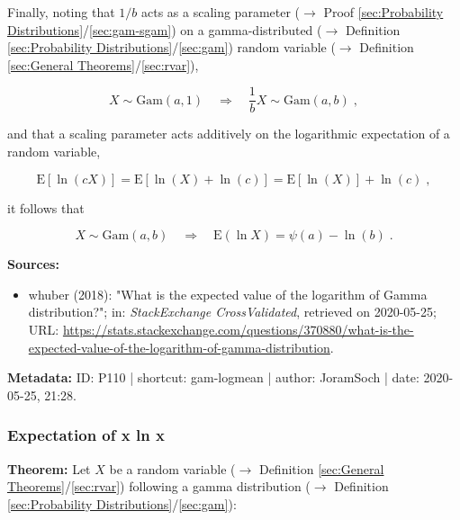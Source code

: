 \documentclass[a4paper,12pt,twoside]{book}
\begin{document}
Finally, noting that $1/b$ acts as a scaling parameter ($\rightarrow$ Proof \ref{sec:Probability Distributions}/\ref{sec:gam-sgam}) on a gamma-distributed ($\rightarrow$ Definition \ref{sec:Probability Distributions}/\ref{sec:gam}) random variable ($\rightarrow$ Definition \ref{sec:General Theorems}/\ref{sec:rvar}),

\begin{equation} \label{eq:gam-logmean-gam-sgam}
X \sim \mathrm{Gam}(a,1) \quad \Rightarrow \quad \frac{1}{b} X \sim \mathrm{Gam}(a,b) \; ,
\end{equation}

and that a scaling parameter acts additively on the logarithmic expectation of a random variable,

\begin{equation} \label{eq:gam-logmean-logmean}
\mathrm{E}\left[\ln(cX)\right] = \mathrm{E}\left[\ln(X) + \ln(c)\right] = \mathrm{E}\left[\ln(X)\right] + \ln(c) \; ,
\end{equation}

it follows that

\begin{equation} \label{eq:gam-logmean-E-Y-s3}
X \sim \mathrm{Gam}(a,b) \quad \Rightarrow \quad \mathrm{E}(\ln X) = \psi(a) - \ln(b) \; .
\end{equation}


\vspace{1em}
\textbf{Sources:}
\begin{itemize}
\item whuber (2018): "What is the expected value of the logarithm of Gamma distribution?"; in: \textit{StackExchange CrossValidated}, retrieved on 2020-05-25; URL: \url{https://stats.stackexchange.com/questions/370880/what-is-the-expected-value-of-the-logarithm-of-gamma-distribution}.
\end{itemize}


\vspace{1em}
\textbf{Metadata:} ID: P110 | shortcut: gam-logmean | author: JoramSoch | date: 2020-05-25, 21:28.
\vspace{1em}



\subsubsection[\textbf{Expectation of x ln x}]{Expectation of x ln x} \label{sec:gam-xlogx}
\setcounter{equation}{0}

\textbf{Theorem:} Let $X$ be a random variable ($\rightarrow$ Definition \ref{sec:General Theorems}/\ref{sec:rvar}) following a gamma distribution ($\rightarrow$ Definition \ref{sec:Probability Distributions}/\ref{sec:gam}):
\end{document}
